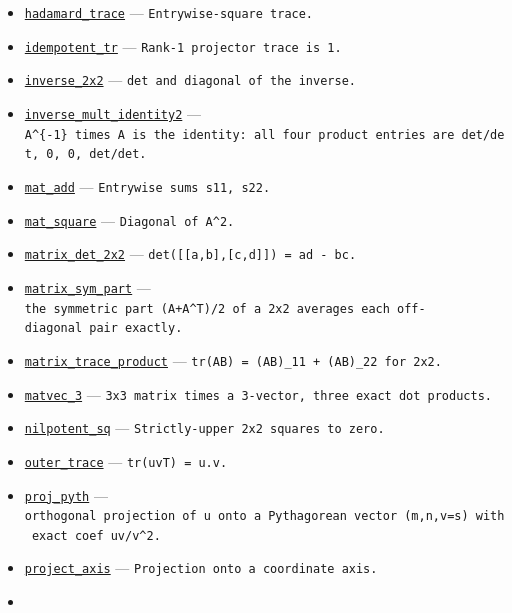 \documentclass[
  10pt,
]{article}
\begin{document}
\begin{itemize}
  \texttt{Gram\ determinant\ identity.}
\item
  \href{../generation_1/I1/algos_gen1_big.py}{\texttt{hadamard\_trace}}
  --- \texttt{Entrywise-square\ trace.}
\item
  \href{../generation_1/I1/algos_gen1_big.py}{\texttt{idempotent\_tr}}
  --- \texttt{Rank-1\ projector\ trace\ is\ 1.}
\item
  \href{../generation_1/I1/algos_gen1_big.py}{\texttt{inverse\_2x2}} ---
  \texttt{det\ and\ diagonal\ of\ the\ inverse.}
\item
  \href{../generation_1/I3/algos_i3.py}{\texttt{inverse\_mult\_identity2}}
  ---
  \texttt{A\^{}\{-1\}\ times\ A\ is\ the\ identity:\ all\ four\ product\ entries\ are\ det/det,\ 0,\ 0,\ det/det.}
\item
  \href{../generation_1/I1/algos_gen1_big.py}{\texttt{mat\_add}} ---
  \texttt{Entrywise\ sums\ s11,\ s22.}
\item
  \href{../generation_1/I1/algos_gen1_big.py}{\texttt{mat\_square}} ---
  \texttt{Diagonal\ of\ A\^{}2.}
\item
  \href{../tools/prm/algos.py}{\texttt{matrix\_det\_2x2}} ---
  \texttt{det({[}{[}a,b{]},{[}c,d{]}{]})\ =\ ad\ -\ bc.}
\item
  \href{../generation_1/I3/algos_i3.py}{\texttt{matrix\_sym\_part}} ---
  \texttt{the\ symmetric\ part\ (A+A\^{}T)/2\ of\ a\ 2x2\ averages\ each\ off-diagonal\ pair\ exactly.}
\item
  \href{../generation_1/I1/algos_gen1_ext.py}{\texttt{matrix\_trace\_product}}
  --- \texttt{tr(AB)\ =\ (AB)\_11\ +\ (AB)\_22\ for\ 2x2.}
\item
  \href{../generation_1/I3/algos_i3.py}{\texttt{matvec\_3}} ---
  \texttt{3x3\ matrix\ times\ a\ 3-vector,\ three\ exact\ dot\ products.}
\item
  \href{../generation_1/I1/algos_gen1_big.py}{\texttt{nilpotent\_sq}}
  --- \texttt{Strictly-upper\ 2x2\ squares\ to\ zero.}
\item
  \href{../generation_1/I1/algos_gen1_big.py}{\texttt{outer\_trace}} ---
  \texttt{tr(uvT)\ =\ u.v.}
\item
  \href{../generation_1/I3/algos_i3.py}{\texttt{proj\_pyth}} ---
  \texttt{orthogonal\ projection\ of\ u\ onto\ a\ Pythagorean\ vector\ (m,n,\textbar{}v\textbar{}=s)\ with\ exact\ coef\ uv/\textbar{}v\textbar{}\^{}2.}
\item
  \href{../generation_1/I1/algos_gen1_big.py}{\texttt{project\_axis}}
  --- \texttt{Projection\ onto\ a\ coordinate\ axis.}
\item

\end{itemize}
\end{document}
